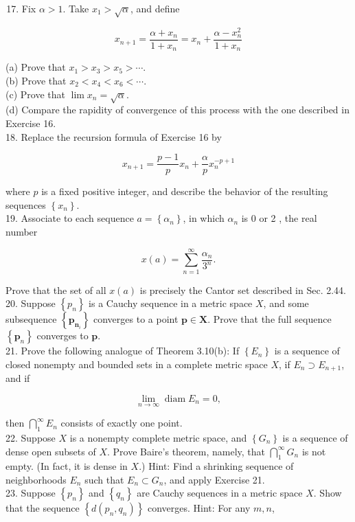 \documentclass[10pt]{article}
\begin{document}
\begin{enumerate}
  \setcounter{enumi}{16}
  \item Fix $\alpha>1$. Take $x_{1}>\sqrt{\alpha}$, and define
\end{enumerate}

$$
x_{n+1}=\frac{\alpha+x_{n}}{1+x_{n}}=x_{n}+\frac{\alpha-x_{n}^{2}}{1+x_{n}}
$$

(a) Prove that $x_{1}>x_{3}>x_{5}>\cdots$.\\
(b) Prove that $x_{2}<x_{4}<x_{6}<\cdots$.\\
(c) Prove that $\lim x_{n}=\sqrt{\alpha}$.\\
(d) Compare the rapidity of convergence of this process with the one described in Exercise 16.\\
18. Replace the recursion formula of Exercise 16 by

$$
x_{n+1}=\frac{p-1}{p} x_{n}+\frac{\alpha}{p} x_{n}^{-p+1}
$$

where $p$ is a fixed positive integer, and describe the behavior of the resulting sequences $\left\{x_{n}\right\}$.\\
19. Associate to each sequence $a=\left\{\alpha_{n}\right\}$, in which $\alpha_{n}$ is 0 or 2 , the real number

$$
x(a)=\sum_{n=1}^{\infty} \frac{\alpha_{n}}{3^{n}} .
$$

Prove that the set of all $x(a)$ is precisely the Cantor set described in Sec. 2.44.\\
20. Suppose $\left\{p_{n}\right\}$ is a Cauchy sequence in a metric space $X$, and some subsequence $\left\{\boldsymbol{p}_{\boldsymbol{n}_{i}}\right\}$ converges to a point $\boldsymbol{p} \in \boldsymbol{X}$. Prove that the full sequence $\left\{\boldsymbol{p}_{n}\right\}$ converges to $\boldsymbol{p}$.\\
21. Prove the following analogue of Theorem 3.10(b): If $\left\{E_{n}\right\}$ is a sequence of closed nonempty and bounded sets in a complete metric space $X$, if $E_{n} \supset E_{n+1}$, and if

$$
\lim _{n \rightarrow \infty} \operatorname{diam} E_{n}=0,
$$

then $\bigcap_{1}^{\infty} E_{n}$ consists of exactly one point.\\
22. Suppose $X$ is a nonempty complete metric space, and $\left\{G_{n}\right\}$ is a sequence of dense open subsets of $X$. Prove Baire's theorem, namely, that $\bigcap_{1}^{\infty} G_{n}$ is not empty. (In fact, it is dense in $X$.) Hint: Find a shrinking sequence of neighborhoods $E_{n}$ such that $E_{n} \subset G_{n}$, and apply Exercise 21.\\
23. Suppose $\left\{p_{n}\right\}$ and $\left\{q_{n}\right\}$ are Cauchy sequences in a metric space $X$. Show that the sequence $\left\{d\left(p_{n}, q_{n}\right)\right\}$ converges. Hint: For any $m, n$,
\end{document}
